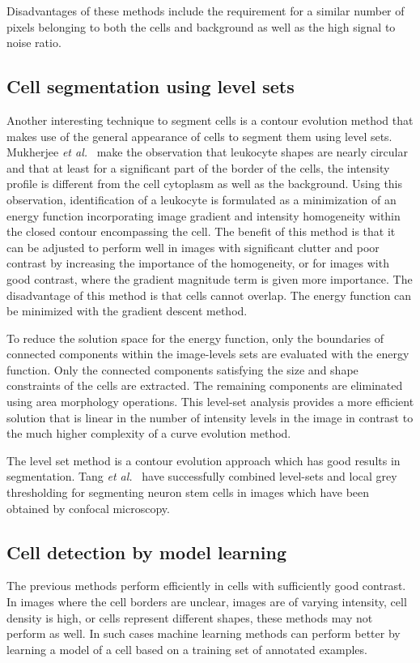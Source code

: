 Disadvantages of these methods include the requirement for a similar number of pixels belonging to both the cells and background as well as the high signal to noise ratio.

\subsection{Cell segmentation using level sets \statusfirstdraft}

Another interesting technique to segment cells is a contour evolution method that makes use of the general appearance of cells to segment them using level sets. Mukherjee \emph{et al.}~\cite{mukherjee04} make the observation that leukocyte shapes are nearly circular and that at least for a significant part of the border of the cells, the intensity profile is different from the cell cytoplasm as well as the background. Using this observation, identification of a leukocyte is formulated as a minimization of an energy function incorporating image gradient and intensity homogeneity within the closed contour encompassing the cell. The benefit of this method is that it can be adjusted to perform well in images with significant clutter and poor contrast by increasing the importance of the homogeneity, or for images with good contrast, where the gradient magnitude term is given more importance. The disadvantage of this method is that cells cannot overlap. The energy function can be minimized with the gradient descent method.

To reduce the solution space for the energy function, only the boundaries of connected components within the image-levels sets are evaluated with the energy function. Only the connected components satisfying the size and shape constraints of the cells are extracted. The remaining components are eliminated using area morphology operations. This level-set analysis provides a more efficient solution that is linear in the number of intensity levels in the image in contrast to the much higher complexity of a curve evolution method.

The level set method is a contour evolution approach which has good results in segmentation. Tang \emph{et al.}~\cite{tang} have successfully combined level-sets and local grey thresholding \cite{xu10} for segmenting neuron stem cells in images which have been obtained by confocal microscopy.

\subsection{Cell detection by model learning \statusfirstdraft}
The previous methods perform efficiently in cells with sufficiently good contrast. In images where the cell borders are unclear, images are of varying intensity, cell density is high, or cells represent different shapes, these methods may not perform as well. In such cases machine learning methods can perform better by learning a model of a cell based on a training set of annotated examples.

